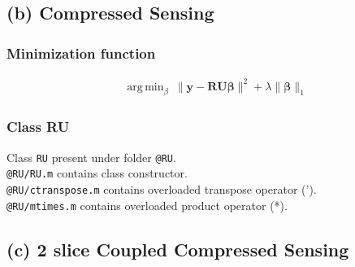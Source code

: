 \documentclass[fleqn, 11pt]{article}
\DeclareMathOperator*{\argmin}{arg\,min}
\begin{document}
\subsection*{(b) Compressed Sensing}
\subsubsection*{Minimization function}
\begin{equation*}
    \begin{aligned}
        & \argmin_\beta \ \lVert \mathbf{y} - \mathbf{R}\mathbf{U}\mathbf{\beta} \rVert^2 + \lambda \lVert \mathbf{\beta} \rVert_1
    \end{aligned}
\end{equation*}

\subsubsection*{Class RU}
Class \texttt{RU} present under folder \texttt{@RU}.\\
\texttt{@RU/RU.m} contains class constructor.\\
\texttt{@RU/ctranspose.m} contains overloaded transpose operator (').\\
\texttt{@RU/mtimes.m} contains overloaded product operator (*).\\


\subsection*{(c) 2 slice Coupled Compressed Sensing}
\end{document}
